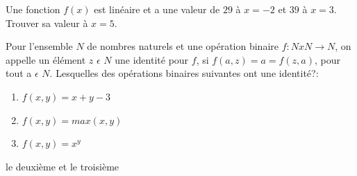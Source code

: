\begin{exercise}
Une fonction $f (x)$ est lin\'eaire et a une valeur de $29$ \`a $x = -2$ et $39$ à $x = 3$. Trouver sa valeur à $x = 5$.
\end{exercise}

\begin{exercise}
Pour l'ensemble $N$ de nombres naturels et une opération binaire $f: N x N \longrightarrow N$, on appelle un élément $z$ $\epsilon$ $N$ une identité pour $f$, si $f (a, z) = a = f (z, a)$, pour tout a $\epsilon$ $N$. Lesquelles des opérations binaires suivantes ont une identité?:
\begin{enumerate}
  \item $f (x, y) = x + y - 3$
  \item $f (x, y) = max(x, y)$
  \item $f (x, y) = x^{y}$
\end{enumerate}
\end{exercise}
\begin{solution}
le deuxième et le troisième 
\end{solution}

